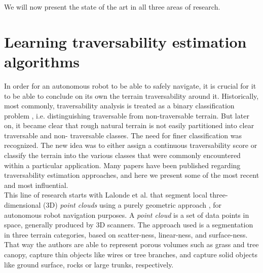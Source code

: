 \documentclass[12pt,a4paper]{report}
\newcommand{\etal}[1]{#1 et al.}
\newcommand{\term}{\textit}
\newcommand{\acronym}{\MakeUppercase}
\begin{document}
	We will now present the state of the art in all three areas of research.
	\\
	
	\section{Learning traversability estimation algorithms}
	\label{sec:bg:trav}
	
	In order for an autonomous robot to be able to safely navigate, it is crucial 
	for it to be able to conclude on its own the terrain traversability 
	around it. Historically, most commonly, traversability analysis is 
	treated as a binary classification problem \cite{Papadakis}, i.e. distinguishing 
	traversable from non-traversable terrain. But later on, it became clear that 
	rough natural terrain is not easily partitioned into clear traversable and non-
	traversable classes. The need for finer classification was recognized. The new 
	idea was to either assign a continuous traversability score or classify 
	the terrain into the various classes that were commonly encountered within a 
	particular application. Many papers have been published regarding 
	traversability estimation approaches, and here we present some of the 
	most recent and most influential.
	\\
	
	This line of research starts with \etal{Lalonde} that segment local three-
	dimensional (\acronym{3d}) \term{point clouds} using a purely geometric 
	approach \cite{Lalonde}, for autonomous robot navigation purposes. A 
	\term{point cloud} is a set of data points in space, generally produced by 
	\acronym{3d} scanners. The approach used is a segmentation in three terrain 
	categories, based on scatter-ness, linear-ness, and surface-ness. That way 
	the authors are able to represent porous volumes such as grass and tree canopy, 
	capture thin objects like wires or tree branches, and capture solid objects 
	like ground surface, rocks or large trunks, respectively.
	\\	
	
\end{document}
